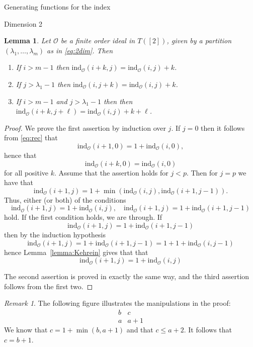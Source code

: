 \documentclass[reqno,a4paper,10pt]{amsart}
\theoremstyle{definition}
\theoremstyle{remark}
\newtheorem{remark}[definition]{Remark}
\theoremstyle{plain}
\newtheorem{lemma}[definition]{Lemma}
\newcommand{\ind}{\mathrm{ind}}
\begin{document}
\begin{section}{Generating functions for the index}
\begin{subsection}{Dimension 2}
  \begin{lemma}\label{lemma:increase2}
    Let \(\mathcal{O}\) be a finite order ideal in \(T([2])\), given
    by a partition \((\lambda_1,\dots,\lambda_m)\) as in
    \eqref{eq:2dim}. Then 
    \begin{enumerate}
    \item     If \(i > m-1\) then \(\ind_\mathcal{O}(i+k,j)=
      \ind_\mathcal{O}(i,j)+k\).  
    \item     If \(j > \lambda_1-1\) then \(\ind_\mathcal{O}(i,j+k)=
      \ind_\mathcal{O}(i,j)+k\). 
    \item     If  \(i > m-1\) and \(j > \lambda_1-1\) then then
    \(\ind_\mathcal{O}(i+k,j+\ell)=
    \ind_\mathcal{O}(i,j)+k+\ell\).
    \end{enumerate}
  \end{lemma}
  \begin{proof}
    We prove the first assertion by induction over \(j\). If \(j=0\)
    then it follows from \eqref{eq:rec} that
    \[\ind_{\mathcal{O}}(i+1,0) = 1 + \ind_{\mathcal{O}}(i,0),\] hence
    that 
    \[\ind_\mathcal{O}(i+k,0)= \ind_\mathcal{O}(i,0)\] for all
    positive \(k\).
    Assume that the assertion holds for \(j<p\). Then for \(j=p\) we
    have that 
    \[\ind_{\mathcal{O}}(i+1,j) = 1 + \min(\ind_{\mathcal{O}}(i,j),
    \ind_{\mathcal{O}}(i+1,j-1)).\]
    Thus, either (or both) of the conditions 
    \[
    \ind_{\mathcal{O}}(i+1,j) = 1+ \ind_{\mathcal{O}}(i,j), \quad
    \ind_{\mathcal{O}}(i+1,j) = 1+ \ind_{\mathcal{O}}(i+1,j-1)
    \]
    hold. If the first condition holds, we are through. If
    \[
    \ind_{\mathcal{O}}(i+1,j) = 1+ \ind_{\mathcal{O}}(i+1,j-1)
    \]
    then by the induction hypothesis
    \[
    \ind_{\mathcal{O}}(i+1,j) = 1+ \ind_{\mathcal{O}}(i+1,j-1) = 1 +
    1+ \ind_{\mathcal{O}}(i,j-1)
    \]
    hence 
    Lemma~\ref{lemma:Kehrein} gives that 
    that 
    \[\ind_{\mathcal{O}}(i+1,j) = 1+ \ind_{\mathcal{O}}(i,j) \] 



    The second assertion is proved in exactly the same way, and the
    third assertion follows from the first two.
  \end{proof}

  \begin{remark}\label{rem:man}
    The following figure illustrates the manipulations in the proof:
    \begin{displaymath}
      \begin{matrix}
        b & c \\
        a & a+1
      \end{matrix}
    \end{displaymath}
    We know that \(c=1+\min(b,a+1)\) and that \(c \le a+2\). It
    follows that \(c=b+1\).
  \end{remark}






\end{subsection}
\end{section}
\end{document}
